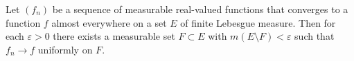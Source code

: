Let $(f_n)$ be a sequence of measurable real-valued functions that converges to a function $f$ almost everywhere on a set $E$ of finite Lebesgue measure. Then for each $\varepsilon > 0$ there exists a measurable set $F \subset E$ with $m(E \setminus F) < \varepsilon$ such that $f_n \to f$ uniformly on $F$.
